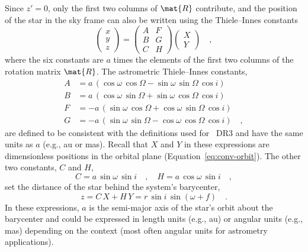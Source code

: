 \documentclass[twocolumn]{AASTeX7/aastex701}
\begin{document}
Since $z' = 0$, only the first two columns of $\mat{R}$ contribute, and the position of
the star in the sky frame can also be written using the Thiele--Innes constants
\citep[e.g.,][]{Wright:2009, Halbwachs:2023}
\begin{equation}
  \begin{pmatrix} x \\ y \\ z \end{pmatrix} =
  \begin{pmatrix} A & F \\ B & G \\ C & H \end{pmatrix}
  \begin{pmatrix} X \\ Y \end{pmatrix}
  \quad ,
  \label{eq:conv-sky}
\end{equation}
where the six constants are $a$ times the elements of the first two columns of the
rotation matrix $\mat{R}$.
The astrometric Thiele--Innes constants,
\begin{align}
  A &= a\,(\cos\omega\,\cos\Omega - \sin\omega\,\sin\Omega\,\cos i) \nonumber \\
  B &= a\,(\cos\omega\,\sin\Omega + \sin\omega\,\cos\Omega\,\cos i) \nonumber \\
  F &= -a\,(\sin\omega\,\cos\Omega + \cos\omega\,\sin\Omega\,\cos i) \nonumber \\
  G &= -a\,(\sin\omega\,\sin\Omega - \cos\omega\,\cos\Omega\,\cos i)
  \quad ,
  \label{eq:conv-thiele-innes}
\end{align}
are defined to be consistent with the definitions used for \gaia\ DR3
\citep{Halbwachs:2023} and have the same units as $a$ (e.g., au or mas).
Recall that $X$ and $Y$ in these expressions are dimensionless positions in the orbital
plane (Equation~\ref{eq:conv-orbit}).
The other two constants, $C$ and $H$,
\begin{equation}
  C = a\,\sin\omega\,\sin i
  \quad , \quad
  H = a\,\cos\omega\,\sin i
  \quad ,
\end{equation}
set the distance of the star behind the system's barycenter,
\begin{equation}
  z = C\,X + H\,Y = r\,\sin i\,\sin(\omega + f)
  \quad .
  \label{eq:conv-z}
\end{equation}
In these expressions, $a$ is the semi-major axis of the star's orbit about the
barycenter and could be expressed in length units (e.g., au) or angular units (e.g.,
mas) depending on the context (most often angular units for astrometry applications).
\end{document}
